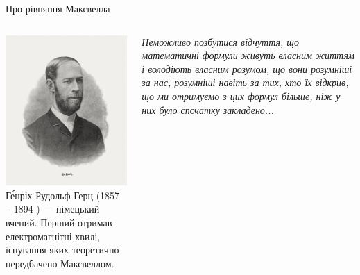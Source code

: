 \documentclass[onlytextwidth]{beamer}
\begin{document}
\begin{frame}{Про рівняння Максвелла}{}
\begin{columns}
	\begin{column}{0.4\linewidth}\centering\scriptsize
            \includegraphics[width=0.75\linewidth]{Hertz}\\


            Ге́нріх Рудольф Герц (1857 -- 1894 ) --- німецький вчений. Перший отримав електромагнітні хвилі, існування яких теоретично передбачено
            Максвеллом.
	\end{column}
	\begin{column}{0.55\linewidth}
\begin{block}{}\justifying\itshape
    Неможливо позбутися відчуття, що математичні формули живуть власним життям і володіють власним розумом, що вони розумніші за нас, розумніші навіть
    за тих, хто їх відкрив, що ми отримуємо з цих формул більше, ніж у них було спочатку закладено...
\end{block}
	\end{column}
\end{columns}
\end{frame}
\end{document}
